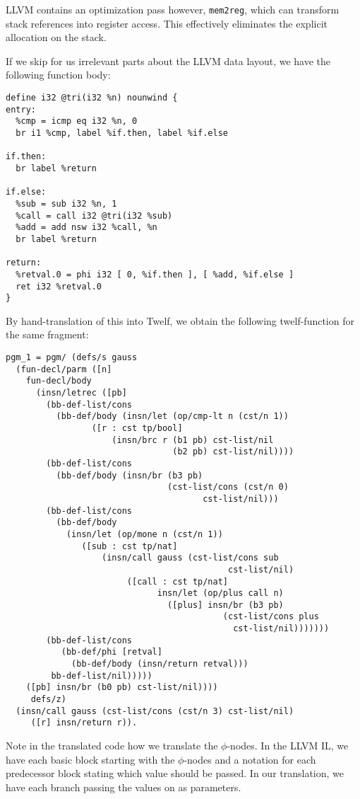 \documentclass[a4paper, oneside, 10pt, draft]{memoir}
\begin{document}
LLVM contains an optimization pass however, \texttt{mem2reg}, which
can transform stack references into register access. This effectively
eliminates the explicit allocation on the stack.

If we skip for us irrelevant parts about the LLVM data layout, we have
the following function body:
\begin{verbatim}
define i32 @tri(i32 %n) nounwind {
entry:
  %cmp = icmp eq i32 %n, 0
  br i1 %cmp, label %if.then, label %if.else

if.then:
  br label %return

if.else:
  %sub = sub i32 %n, 1
  %call = call i32 @tri(i32 %sub)
  %add = add nsw i32 %call, %n
  br label %return

return:
  %retval.0 = phi i32 [ 0, %if.then ], [ %add, %if.else ]
  ret i32 %retval.0
}
\end{verbatim}
By hand-translation of this into Twelf, we obtain the following
twelf-function for the same fragment:
\begin{verbatim}
pgm_1 = pgm/ (defs/s gauss
  (fun-decl/parm ([n]
    fun-decl/body
      (insn/letrec ([pb]
        (bb-def-list/cons
          (bb-def/body (insn/let (op/cmp-lt n (cst/n 1))
    		     ([r : cst tp/bool]
                     (insn/brc r (b1 pb) cst-list/nil
                                 (b2 pb) cst-list/nil))))
        (bb-def-list/cons
          (bb-def/body (insn/br (b3 pb)
                                (cst-list/cons (cst/n 0)
                                       cst-list/nil)))
        (bb-def-list/cons
          (bb-def/body
    	    (insn/let (op/mone n (cst/n 1))
    	       ([sub : cst tp/nat]
                   (insn/call gauss (cst-list/cons sub
                                            cst-list/nil)
                        ([call : cst tp/nat]
                              insn/let (op/plus call n)
                                ([plus] insn/br (b3 pb)
                                           (cst-list/cons plus
                                             cst-list/nil)))))))
        (bb-def-list/cons
           (bb-def/phi [retval]
    	     (bb-def/body (insn/return retval)))
         bb-def-list/nil)))))
    ([pb] insn/br (b0 pb) cst-list/nil))))
     defs/z)
  (insn/call gauss (cst-list/cons (cst/n 3) cst-list/nil)
     ([r] insn/return r)).
\end{verbatim}

Note in the translated code how we translate the $\phi$-nodes. In the
LLVM IL, we have each basic block starting with the $\phi$-nodes and a
notation for each predecessor block stating which value should be
passed. In our translation, we have each branch passing the values on
as parameters.
\end{document}
